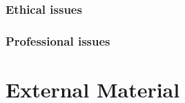 \begin{appendices}
\subsection{Ethical issues}

\subsection{Professional issues}


%
%
\chapter{External Material}




%
%



\end{appendices}
